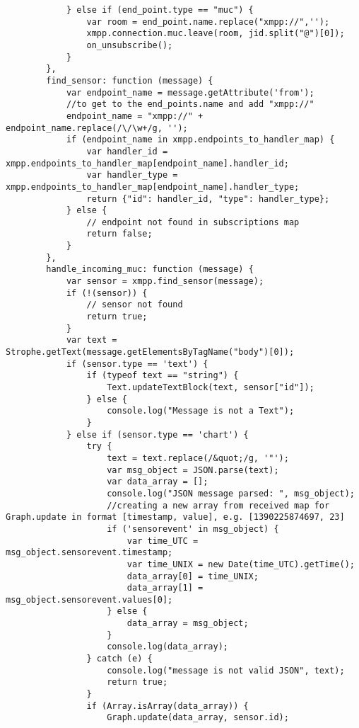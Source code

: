 \begin{lstlisting}
            } else if (end_point.type == "muc") {
                var room = end_point.name.replace("xmpp://",'');
                xmpp.connection.muc.leave(room, jid.split("@")[0]);
                on_unsubscribe();
            }
        },
        find_sensor: function (message) {
            var endpoint_name = message.getAttribute('from');
            //to get to the end_points.name and add "xmpp://"
            endpoint_name = "xmpp://" + endpoint_name.replace(/\/\w+/g, '');
            if (endpoint_name in xmpp.endpoints_to_handler_map) {
                var handler_id = xmpp.endpoints_to_handler_map[endpoint_name].handler_id;
                var handler_type = xmpp.endpoints_to_handler_map[endpoint_name].handler_type;
                return {"id": handler_id, "type": handler_type};
            } else {
                // endpoint not found in subscriptions map
                return false;
            }
        },
        handle_incoming_muc: function (message) {
            var sensor = xmpp.find_sensor(message);
            if (!(sensor)) {
                // sensor not found
                return true;
            }
            var text = Strophe.getText(message.getElementsByTagName("body")[0]);
            if (sensor.type == 'text') {
                if (typeof text == "string") {
                    Text.updateTextBlock(text, sensor["id"]);
                } else {
                    console.log("Message is not a Text");
                }
            } else if (sensor.type == 'chart') {
                try {
                    text = text.replace(/&quot;/g, '"');
                    var msg_object = JSON.parse(text);
                    var data_array = [];
                    console.log("JSON message parsed: ", msg_object);
                    //creating a new array from received map for Graph.update in format [timestamp, value], e.g. [1390225874697, 23]
                    if ('sensorevent' in msg_object) {
                        var time_UTC = msg_object.sensorevent.timestamp;
                        var time_UNIX = new Date(time_UTC).getTime();
                        data_array[0] = time_UNIX;
                        data_array[1] = msg_object.sensorevent.values[0];
                    } else {
                        data_array = msg_object;
                    }
                    console.log(data_array);
                } catch (e) {
                    console.log("message is not valid JSON", text);
                    return true;
                }
                if (Array.isArray(data_array)) {
                    Graph.update(data_array, sensor.id);

\end{lstlisting}
